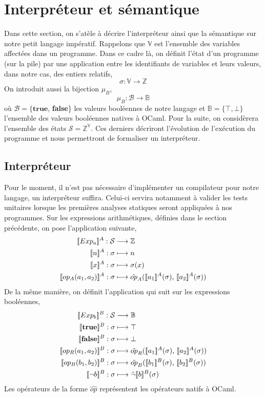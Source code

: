 \documentclass[a4paper, 11pt]{article}
\begin{document}
\begin{center}\end{center}

\section{Interpréteur et sémantique}
Dans cette section, on s'atèle à décrire l'interpréteur ainsi que la sémantique sur notre petit langage impératif. Rappelons que
$\mathbb{V}$ est l'ensemble des variables affectées dans un programme.
Dans ce cadre là, on définit l'état d'un programme (sur la pile) par une application entre les identifiants de variables et leurs valeurs, 
dans notre cas, des entiers relatifs,
\[\sigma : \mathbb{V} \longrightarrow \mathbb{Z}\]
On introduit aussi la bijection $\mu_B$,
\[\mu_B : \mathcal{B} \longrightarrow \mathbb{B}\]
où $\mathcal{B} = \{\textbf{true}$, \textbf{false}\} les valeurs booléennes de notre langage et $\mathbb{B} = \{\top, \bot\}$ 
l'ensemble des valeurs booléennes natives à OCaml. Pour la suite, on considèrera l'ensemble des états $\mathcal{S} = \mathbb{Z}^\mathbb{V}$.
Ces derniers décriront l'évolution de l'exécution du programme et nous permettront de formaliser un interpréteur.

\subsection{Interpréteur}
Pour le moment, il n'est pas nécessaire d'implémenter un compilateur pour notre langage, un interpréteur suffira.
Celui-ci servira notamment à valider les tests unitaires lorsque les premières analyses statiques seront appliquées
à nos programmes.
Sur les expressions arithmétiques, définies dans le section précédente, on pose l'application suivante,
\begin{align*}
	\intrfun{Exp_a}{A}:\mathcal{S}&\longrightarrow\mathbb{Z}\\
	\intrfun{n}{A}:\sigma&\longmapsto n\\
	\intrfun{x}{A}:\sigma&\longmapsto\sigma(x)\\
	\intrfun{op_A(a_1, a_2)}{A}:\sigma&\longmapsto\hat{op}_A(\intr{a_1}{A}{\sigma}\text{, }\intr{a_2}{A}{\sigma})\\
\end{align*}
De la même manière, on définit l'application qui suit sur les expressions booléennes,
\begin{align*}
	\intrfun{Exp_b}{B}:\mathcal{S}&\longrightarrow\mathbb{B}\\	
	\intrfun{\textbf{true}}{B}:\sigma&\longmapsto\top\\
	\intrfun{\textbf{false}}{B}:\sigma&\longmapsto\bot\\
	\intrfun{op_R(a_1, a_2)}{B}:\sigma &\longmapsto \hat{op}_R(\intr{a_1}{A}{\sigma}\text{, }\intr{a_2}{A}{\sigma})\\
	\intrfun{op_B(b_1, b_2)}{B}:\sigma&\longmapsto \hat{op}_B(\intr{b_1}{B}{\sigma}\text{, }\intr{b_2}{B}{\sigma})\\
	\intrfun{\neg b}{B}:\sigma&\longmapsto\hat{\neg}\intr{b}{B}{\sigma}
\end{align*}
Les opérateurs de la forme $\hat{op}$ représentent les opérateurs natifs à OCaml.
\end{document}
